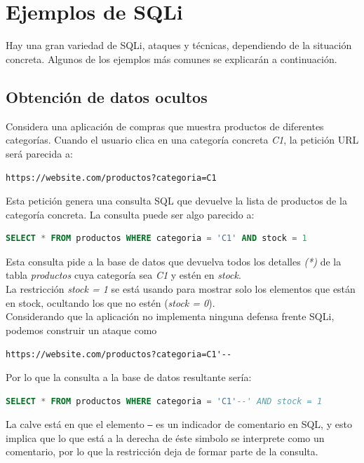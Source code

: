 \documentclass[bibliography=totocnumbered]{scrartcl}
\begin{document}
\section{Ejemplos de SQLi}
Hay una gran variedad de SQLi, ataques y técnicas, dependiendo de la situación concreta. Algunos de los ejemplos más comunes se explicarán a continuación.

\subsection{Obtención de datos ocultos}
Considera una aplicación de compras que muestra productos de diferentes categorías. Cuando el usuario clica en una categoría concreta \textit{C1}, la petición URL será parecida a:
\begin{center}
\nolinkurl{https://website.com/productos?categoria=C1}
\end{center}
Esta petición genera una consulta SQL que devuelve la lista de productos de la categoría concreta. La consulta puede ser algo parecido a:
\begin{lstlisting}[language=SQL]
        SELECT * FROM productos WHERE categoria = 'C1' AND stock = 1
\end{lstlisting}
Esta consulta pide a la base de datos que devuelva todos los detalles \textit{(*)} de la tabla \textit{productos} cuya categoría sea \textit{C1} y estén en \textit{stock}.\\
La restricción \textit{stock = 1} se está usando para mostrar solo los elementos que están en stock, ocultando los que no estén (\textit{stock = 0}).\\

Considerando que la aplicación no implementa ninguna defensa frente SQLi, podemos construir un ataque como
\begin{center}
\nolinkurl{https://website.com/productos?categoria=C1'--}
\end{center}
Por lo que la consulta a la base de datos resultante sería:
\begin{lstlisting}[language=SQL]
        SELECT * FROM productos WHERE categoria = 'C1'--' AND stock = 1
\end{lstlisting}
La calve está en que el elemento \textit{\texttt{--}} es un indicador de comentario en SQL, y esto implica que lo que está a la derecha de éste simbolo se interprete como un comentario, por lo que la restricción deja de formar parte de la consulta.\\
\end{document}

